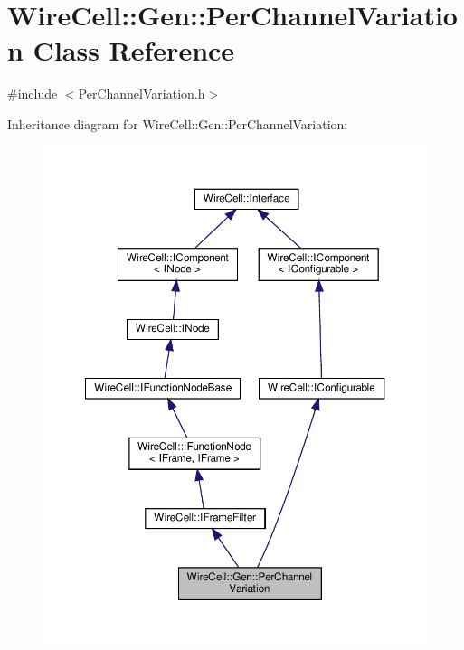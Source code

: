 \hypertarget{class_wire_cell_1_1_gen_1_1_per_channel_variation}{}\section{Wire\+Cell\+:\+:Gen\+:\+:Per\+Channel\+Variation Class Reference}
\label{class_wire_cell_1_1_gen_1_1_per_channel_variation}


{\ttfamily \#include $<$Per\+Channel\+Variation.\+h$>$}



Inheritance diagram for Wire\+Cell\+:\+:Gen\+:\+:Per\+Channel\+Variation\+:
\nopagebreak
\begin{figure}[H]
\begin{center}
\leavevmode
\includegraphics[width=350pt]{class_wire_cell_1_1_gen_1_1_per_channel_variation__inherit__graph}
\end{center}
\end{figure}


